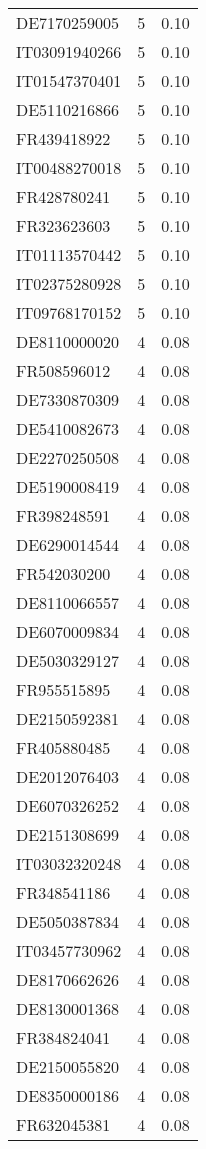 \begin{table*}[htbp]
\begin{tabular}{lrr}
DE7170259005 & 5 & 0.10 \\
IT03091940266 & 5 & 0.10 \\
IT01547370401 & 5 & 0.10 \\
DE5110216866 & 5 & 0.10 \\
FR439418922 & 5 & 0.10 \\
IT00488270018 & 5 & 0.10 \\
FR428780241 & 5 & 0.10 \\
FR323623603 & 5 & 0.10 \\
IT01113570442 & 5 & 0.10 \\
IT02375280928 & 5 & 0.10 \\
IT09768170152 & 5 & 0.10 \\
DE8110000020 & 4 & 0.08 \\
FR508596012 & 4 & 0.08 \\
DE7330870309 & 4 & 0.08 \\
DE5410082673 & 4 & 0.08 \\
DE2270250508 & 4 & 0.08 \\
DE5190008419 & 4 & 0.08 \\
FR398248591 & 4 & 0.08 \\
DE6290014544 & 4 & 0.08 \\
FR542030200 & 4 & 0.08 \\
DE8110066557 & 4 & 0.08 \\
DE6070009834 & 4 & 0.08 \\
DE5030329127 & 4 & 0.08 \\
FR955515895 & 4 & 0.08 \\
DE2150592381 & 4 & 0.08 \\
FR405880485 & 4 & 0.08 \\
DE2012076403 & 4 & 0.08 \\
DE6070326252 & 4 & 0.08 \\
DE2151308699 & 4 & 0.08 \\
IT03032320248 & 4 & 0.08 \\
FR348541186 & 4 & 0.08 \\
DE5050387834 & 4 & 0.08 \\
IT03457730962 & 4 & 0.08 \\
DE8170662626 & 4 & 0.08 \\
DE8130001368 & 4 & 0.08 \\
FR384824041 & 4 & 0.08 \\
DE2150055820 & 4 & 0.08 \\
DE8350000186 & 4 & 0.08 \\
FR632045381 & 4 & 0.08 \\

\end{tabular}
\end{table*}
